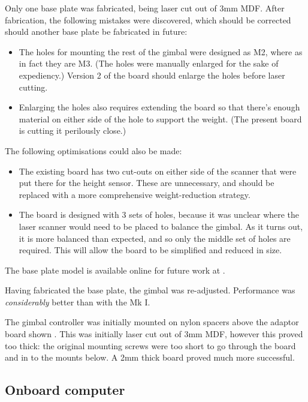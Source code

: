 \documentclass[12pt,oneside,a4paper]{book}
\begin{document}
Only one base plate was fabricated, being laser cut out of 3mm
MDF. After fabrication, the following mistakes were discovered, which
should be corrected should another base plate be fabricated in future:
\begin{itemize}
\item The holes for mounting the rest of the gimbal were designed as
  M2, where as in fact they are M3. (The holes were manually enlarged
  for the sake of expediency.) Version 2 of the board should enlarge
  the holes before laser cutting.
\item Enlarging the holes also requires extending the board so that
  there's enough material on either side of the hole to support the
  weight. (The present board is cutting it perilously close.)
\end{itemize}

The following optimisations could also be made:
\begin{itemize}
\item The existing board has two cut-outs on either side of the
  scanner that were put there for the height sensor. These are
  unnecessary, and should be replaced with a more comprehensive
  weight-reduction strategy.
\item The board is designed with 3 sets of holes, because it was
  unclear where the laser scanner would need to be placed to balance
  the gimbal. As it turns out, it is more balanced than expected, and
  so only the middle set of holes are required. This will allow the
  board to be simplified and reduced in size.
\end{itemize}

The base plate model is available online for future work at
.

Having fabricated the base plate, the gimbal was
re-adjusted. Performance was \emph{considerably} better than with the
Mk I.

The gimbal controller was initially mounted on nylon spacers above the adaptor board
shown . This was initially laser cut out of 3mm MDF,
however this proved too thick: the original mounting screws were too
short to go through the board and in to the mounts below. A 2mm thick board
proved much more successful.

\subsection{Onboard computer}
\label{sec:onboard-computer}
\end{document}
